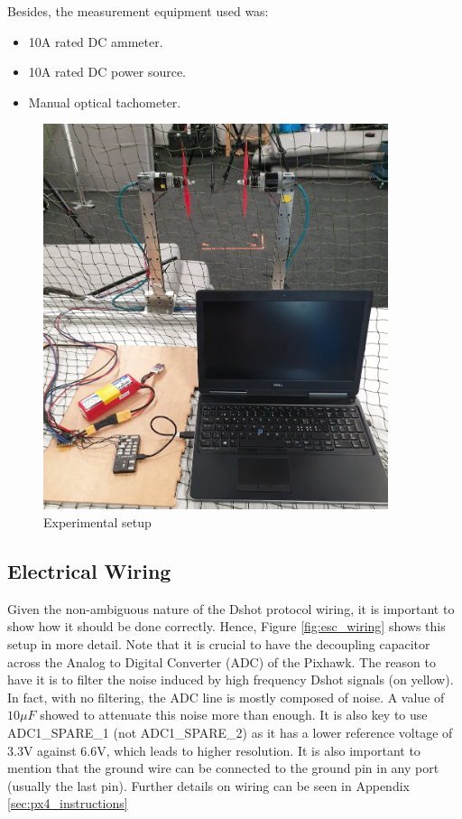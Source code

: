 Besides, the measurement equipment used was:

\begin{itemize}
		\item 10A rated DC ammeter.
		\item 10A rated DC power source.
		\item Manual optical tachometer.
\end{itemize}


\begin{figure} 
    \centering
    \includegraphics[width=0.9\textwidth]{images/setup_photo.png}
    \caption{Experimental setup}
    \label{fig:exp_setup}
\end{figure}


\subsection{Electrical Wiring}
Given the non-ambiguous nature of the Dshot protocol wiring, it is important to show how it should be done correctly. Hence, Figure \ref{fig:esc_wiring} shows this setup in more detail.
\newline
Note that it is crucial to have the decoupling capacitor across the Analog to Digital Converter (ADC) of the Pixhawk. The reason to have it is to filter the noise induced by high frequency Dshot signals (on yellow). In fact, with no filtering, the ADC line is mostly composed of noise. A value of $10\mu F$ showed to attenuate this noise more than enough. It is also key to use ADC1\_SPARE\_1 (not ADC1\_SPARE\_2) as it has a lower reference voltage of 3.3V against 6.6V, which leads to higher resolution.
\newline
It is also important to mention that the ground wire can be connected to the ground pin in any port (usually the last pin). Further details on wiring can be seen in Appendix \ref{sec:px4_instructions}


